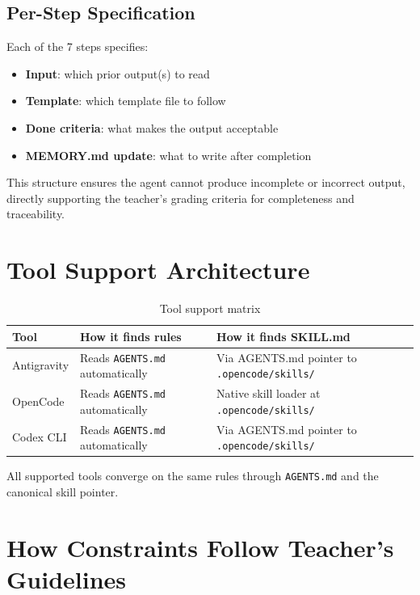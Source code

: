 \documentclass[12pt,a4paper]{article}
\begin{document}
\subsection{Per-Step Specification}

Each of the 7 steps specifies:
\begin{itemize}
    \item \textbf{Input}: which prior output(s) to read
    \item \textbf{Template}: which template file to follow
    \item \textbf{Done criteria}: what makes the output acceptable
    \item \textbf{MEMORY.md update}: what to write after completion
\end{itemize}

This structure ensures the agent cannot produce incomplete or incorrect output, directly supporting the teacher's grading criteria for completeness and traceability.

\section{Tool Support Architecture}

\begin{table}[h]
\centering
\begin{tabular}{|l|p{3cm}|p{5cm}|}
\hline
\textbf{Tool} & \textbf{How it finds rules} & \textbf{How it finds SKILL.md} \\
\hline
Antigravity & Reads \texttt{AGENTS.md} automatically & Via AGENTS.md pointer to \texttt{.opencode/skills/} \\
\hline
OpenCode & Reads \texttt{AGENTS.md} automatically & Native skill loader at \texttt{.opencode/skills/} \\
\hline
Codex CLI & Reads \texttt{AGENTS.md} automatically & Via AGENTS.md pointer to \texttt{.opencode/skills/} \\
\hline
\end{tabular}
\caption{Tool support matrix}
\end{table}

All supported tools converge on the same rules through \texttt{AGENTS.md} and the canonical skill pointer.

\section{How Constraints Follow Teacher's Guidelines}
\end{document}
